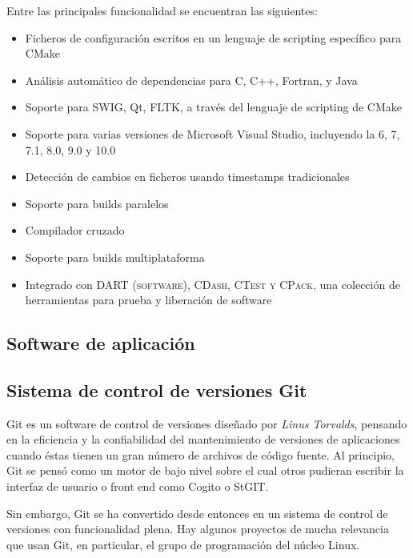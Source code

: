 \documentclass[12pt]{book} %
\begin{document}
		Entre las principales funcionalidad se encuentran las siguientes:
		\begin{multicols}{2}
			\begin{itemize}
				\item Ficheros de configuración escritos en un lenguaje de scripting específico para CMake
				\item Análisis automático de dependencias para C, C++, Fortran, y Java
				\item Soporte para SWIG, Qt, FLTK, a través del lenguaje de scripting de CMake
				\item Soporte para varias versiones de Microsoft Visual Studio, incluyendo la 6, 7, 7.1, 8.0, 9.0 y 10.0
				\item Detección de cambios en ficheros usando timestamps tradicionales
				\item Soporte para builds paralelos
				\item Compilador cruzado
				\item Soporte para builds multiplataforma
				\item Integrado con \textsc{DART (software), CDash, CTest y CPack}, una colección de herramientas para prueba y liberación
				 de software
			\end{itemize}
		\end{multicols}
		
	\subsection*{Software de aplicación}
	
	\subsection{Sistema de control de versiones Git \label{git}}
		Git es un software de control de versiones diseñado por \textit{Linus Torvalds}, pensando en la eficiencia y la confiabilidad del
		mantenimiento de versiones de aplicaciones cuando éstas tienen un gran número de archivos de código fuente. Al principio, Git se
		pensó como un motor de bajo nivel sobre el cual otros pudieran escribir la interfaz de usuario o front end como Cogito o StGIT. 
		
		Sin embargo, Git se ha convertido desde entonces en un sistema de control de versiones con funcionalidad plena. Hay algunos
		proyectos de mucha relevancia que usan Git, en particular, el grupo de programación del núcleo Linux.
		
\end{document}
